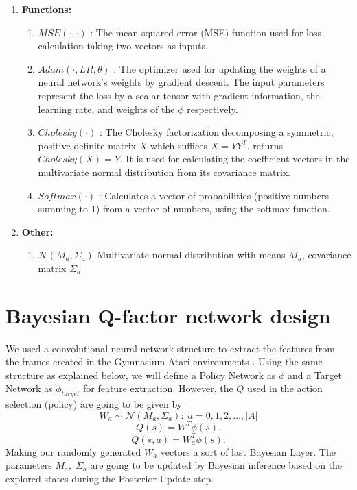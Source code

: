 \documentclass{article}
\begin{document}
\begin{enumerate}
\begin{enumerate}
    \end{enumerate}
    \item\textbf{Functions:}
    \begin{enumerate}
        \item$MSE(\cdot,\cdot)$ : The mean squared error (MSE) function used for loss calculation taking two vectors as inputs.
        \item$Adam(\cdot,LR,\theta)$ : The optimizer used for updating the weights of a neural network's weights by gradient descent. The input parameters represent the loss by a scalar tensor with gradient information, the learning rate, and weights of the $\phi$ respectively.
        \item$Cholesky(\cdot)$ : The Cholesky factorization decomposing a symmetric, positive-definite matrix $X$ which suffices $X =YY^T$, returns $Cholesky(X) = Y$. It is used for calculating the coefficient vectors in the multivariate normal distribution from its covariance matrix.
        \item$Softmax(\cdot)$ : Calculates a vector of probabilities (positive numbers summing to 1) from a vector of numbers, using the softmax function.
    \end{enumerate}
    \item\textbf{Other:}
    \begin{enumerate}
        \item $\mathcal{N}(M_a,\Sigma_a)$ Multivariate normal distribution with means $M_a$, covariance matrix $\Sigma_a$
    \end{enumerate}
\end{enumerate}

\section{Bayesian Q-factor network design}
We used a convolutional neural network structure to extract the features from the frames created in the Gymnasium Atari environments \cite{Gym}. Using the same structure as explained below, we will define a Policy Network as $\phi$ and a Target Network as $\phi_{target}$ for feature extraction. However, the $Q$ used in the action selection (policy) are going to be given by
\[W_a \sim \mathcal{N}(M_a,\Sigma_a) : \; a=0,1,2,\dots,|A|\]
\[Q(s) = W^T\phi(s).\]
\[Q(s,a) = W_a^T\phi(s).\]
Making our randomly generated $W_a$ vectors a sort of last Bayesian Layer. The parameters $M_a,\;\Sigma_a$ are going to be updated by Bayesian inference based on the explored states during the Posterior Update step.
\end{document}
